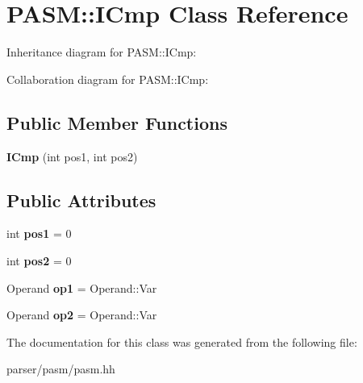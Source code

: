\hypertarget{classPASM_1_1ICmp}{}\section{P\+A\+SM\+:\+:I\+Cmp Class Reference}
\label{classPASM_1_1ICmp}


Inheritance diagram for P\+A\+SM\+:\+:I\+Cmp\+:


Collaboration diagram for P\+A\+SM\+:\+:I\+Cmp\+:
\subsection*{Public Member Functions}
\begin{DoxyCompactItemize}
\item 
\mbox{\label{classPASM_1_1ICmp_ad5903107b9189a82dc026f7c5821443e}} 
{\bfseries I\+Cmp} (int pos1, int pos2)
\end{DoxyCompactItemize}
\subsection*{Public Attributes}
\begin{DoxyCompactItemize}
\item 
\mbox{\label{classPASM_1_1ICmp_a090107593f8e36c9503745a57ab37912}} 
int {\bfseries pos1} = 0
\item 
\mbox{\label{classPASM_1_1ICmp_a7766e86018ab9ad20962d59e0d3e13fd}} 
int {\bfseries pos2} = 0
\item 
\mbox{\label{classPASM_1_1ICmp_a578172031168ad595b68307447d3c715}} 
Operand {\bfseries op1} = Operand\+::\+Var
\item 
\mbox{\label{classPASM_1_1ICmp_a73a40676098d0478b7e509f12a70dccd}} 
Operand {\bfseries op2} = Operand\+::\+Var
\end{DoxyCompactItemize}


The documentation for this class was generated from the following file\+:\begin{DoxyCompactItemize}
\item 
parser/pasm/pasm.\+hh\end{DoxyCompactItemize}
